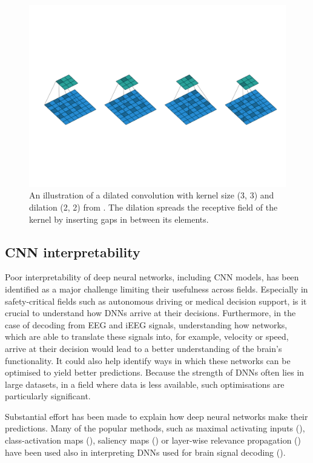 \begin{figure}[!htpb]
\centering
   \includegraphics[width=0.8\linewidth]{img/ch3/dilated-conv}
   \caption[Dilated convolution]{An illustration of a dilated convolution with kernel size (3, 3) and dilation (2, 2) from \cite{dilated-conv}. The dilation spreads the receptive field of the kernel by inserting gaps in between its elements.}
   \label{fig:dilation}
\end{figure}


\subsection{CNN interpretability}\label{subsec:cnn-interpretability}
Poor interpretability of deep neural networks, including CNN models, has been identified as a major challenge limiting their usefulness across fields. 
Especially in safety-critical fields such as autonomous driving or medical decision support, is it crucial to understand how DNNs arrive at their decisions.
Furthermore, in the case of decoding from EEG and iEEG signals, understanding how networks, which are able to translate these signals into, for example, velocity or speed, arrive at their decision would lead to a better understanding of the brain's functionality. 
It could also help identify ways in which these networks can be optimised to yield better predictions.
Because the strength of DNNs often lies in large datasets, in a field where data is less available, such optimisations are particularly significant.

Substantial effort has been made to explain how deep neural networks make their predictions.
Many of the popular methods, such as maximal activating inputs (\cite{maximizing-activation}), class-activation maps (\cite{class-activation-maps}), saliency maps (\cite{gradient-visualization}) or layer-wise relevance propagation (\cite{sturm-interpretable-2016}) have been used also in interpreting DNNs used for brain signal decoding (\cite{goodfellow-towards-2018, hartmann-hierarchical-2018, rieke-visualizing-2018, yang-visual-2018,  sturm-interpretable-2016,}).

